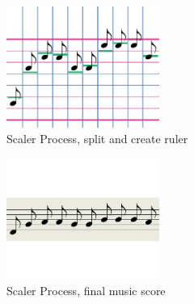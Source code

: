 \begin{figure}[H]
\centering
\newcommand{\widthOfScalerStepFigure}{5cm}
\includegraphics[width=\widthOfScalerStepFigure]{figWR/scaler1}
\caption{Scaler Process, split and create ruler}
\label{scalerStep1}
\end{figure}

\begin{figure}[H]
\centering
\newcommand{\widthOfScalerStepFigure}{5cm}
\includegraphics[width=\widthOfScalerStepFigure]{figWR/scaler2}
\caption{Scaler Process, final music score}
\label{scalerStep2}
\end{figure}


